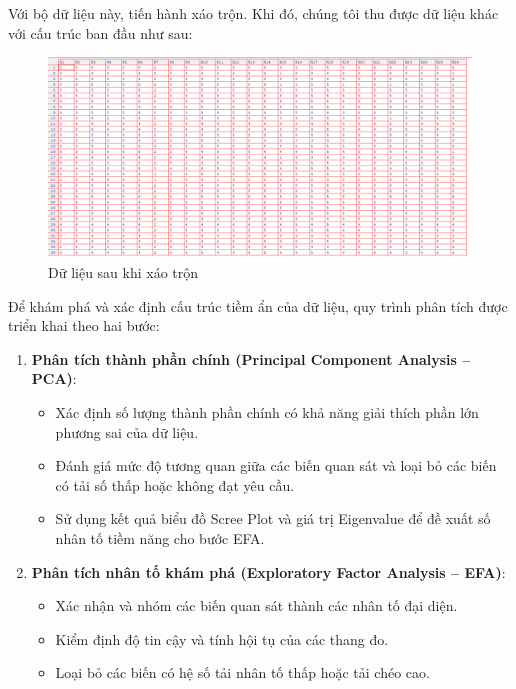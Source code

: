Với bộ dữ liệu này, tiến hành xáo trộn. Khi đó, chúng tôi thu được dữ liệu khác với cấu trúc ban đầu như sau:
\begin{figure}[h!]
    \centering
    \includegraphics[width=\textwidth]{../../assets/images/data2b.png}
    \caption{Dữ liệu sau khi xáo trộn}
    \label{fig:shuffled_data}
\end{figure}

Để khám phá và xác định cấu trúc tiềm ẩn của dữ liệu, quy trình phân tích được triển khai theo hai bước:

\begin{enumerate}
    \item \textbf{Phân tích thành phần chính (Principal Component Analysis -- PCA)}:
    \begin{itemize}
        \item Xác định số lượng thành phần chính có khả năng giải thích phần lớn phương sai của dữ liệu.
        \item Đánh giá mức độ tương quan giữa các biến quan sát và loại bỏ các biến có tải số thấp hoặc không đạt yêu cầu.
        \item Sử dụng kết quả biểu đồ Scree Plot và giá trị Eigenvalue để đề xuất số nhân tố tiềm năng cho bước EFA.
    \end{itemize}

    \item \textbf{Phân tích nhân tố khám phá (Exploratory Factor Analysis -- EFA)}:
    \begin{itemize}
        \item Xác nhận và nhóm các biến quan sát thành các nhân tố đại diện.
        \item Kiểm định độ tin cậy và tính hội tụ của các thang đo.
        \item Loại bỏ các biến có hệ số tải nhân tố thấp hoặc tải chéo cao.
    \end{itemize}
\end{enumerate}

